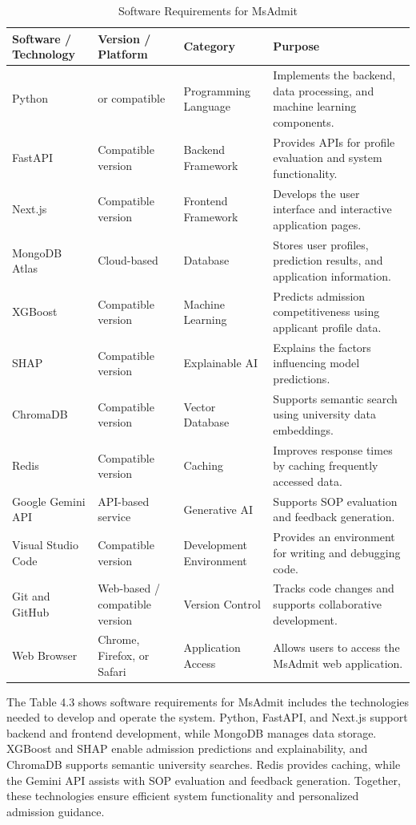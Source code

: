 \begin{table}[H]
\centering
\caption{Software Requirements for MsAdmit}
\label{tab:software_requirements}
\renewcommand{\arraystretch}{1.3}
\begin{tabularx}{\textwidth}{
|>{\raggedright\arraybackslash}p{3cm}
|>{\raggedright\arraybackslash}p{3cm}
|>{\raggedright\arraybackslash}p{3cm}
|X|}
\hline
\textbf{Software / Technology} &
\textbf{Version / Platform} &
\textbf{Category} &
\textbf{Purpose} \\
\hline
Python &
3.10 or compatible &
Programming Language &
Implements the backend, data processing, and machine learning components. \\
\hline
FastAPI &
Compatible version &
Backend Framework &
Provides APIs for profile evaluation and system functionality. \\
\hline
Next.js &
Compatible version &
Frontend Framework &
Develops the user interface and interactive application pages. \\
\hline
MongoDB Atlas &
Cloud-based &
Database &
Stores user profiles, prediction results, and application information. \\
\hline
XGBoost &
Compatible version &
Machine Learning &
Predicts admission competitiveness using applicant profile data. \\
\hline
SHAP &
Compatible version &
Explainable AI &
Explains the factors influencing model predictions. \\
\hline
ChromaDB &
Compatible version &
Vector Database &
Supports semantic search using university data embeddings. \\
\hline
Redis &
Compatible version &
Caching &
Improves response times by caching frequently accessed data. \\
\hline
Google Gemini API &
API-based service &
Generative AI &
Supports SOP evaluation and feedback generation. \\
\hline
Visual Studio Code &
Compatible version &
Development Environment &
Provides an environment for writing and debugging code. \\
\hline
Git and GitHub &
Web-based / compatible version &
Version Control &
Tracks code changes and supports collaborative development. \\
\hline
Web Browser &
Chrome, Firefox, or Safari &
Application Access &
Allows users to access the MsAdmit web application. \\
\hline
\end{tabularx}
\end{table}
\justify
The Table 4.3 shows software requirements for MsAdmit includes the technologies needed to develop and operate the system. Python, FastAPI, and Next.js support backend and frontend development, while MongoDB manages data storage. XGBoost and SHAP enable admission predictions and explainability, and ChromaDB supports semantic university searches. Redis provides caching, while the Gemini API assists with SOP evaluation and feedback generation. Together, these technologies ensure efficient system functionality and personalized admission guidance.

